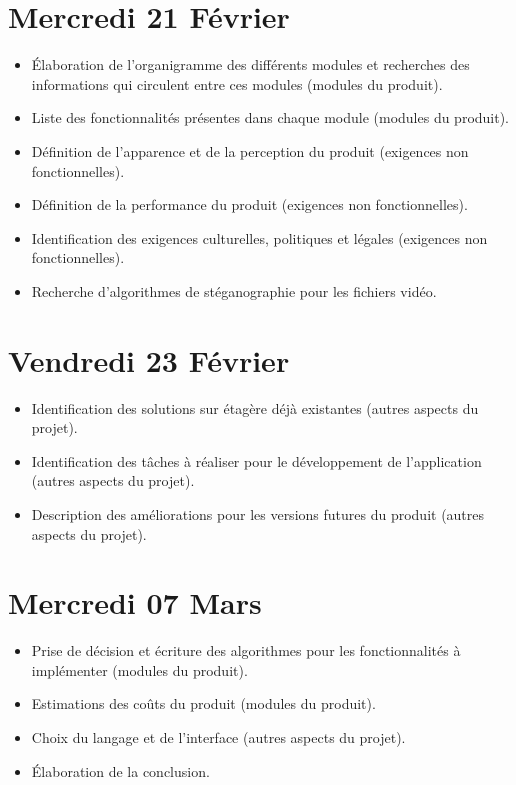 \documentclass[11pt]{article}
\begin{document}
\section{Mercredi 21 Février}
\begin {itemize}
\item Élaboration de l'organigramme des différents modules et recherches des informations qui circulent entre ces modules (modules du produit).
\item Liste des fonctionnalités présentes dans chaque module (modules du produit).
\item Définition de l'apparence et de la perception du produit (exigences non fonctionnelles).
\item Définition de la performance du produit (exigences non fonctionnelles).
\item Identification des exigences culturelles, politiques et légales (exigences non fonctionnelles).
\item Recherche d'algorithmes de stéganographie pour les fichiers vidéo.
\end{itemize}

\section{Vendredi 23 Février}
\begin {itemize}
\item Identification des solutions sur étagère déjà existantes (autres aspects du projet).
\item Identification des tâches à réaliser pour le développement de l'application (autres aspects du projet).
\item Description des améliorations pour les versions futures du produit (autres aspects du projet).
\end{itemize}

\section{Mercredi 07 Mars}
\begin {itemize}
\item Prise de décision et écriture des algorithmes pour les fonctionnalités à implémenter (modules du produit).
\item Estimations des coûts du produit (modules du produit).
\item Choix du langage et de l'interface (autres aspects du projet).
\item Élaboration de la conclusion.
\end{itemize}
\end{document}
